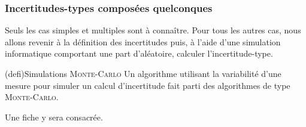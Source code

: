 \documentclass[../../main/main.tex]{subfiles}
\begin{document}
\subsubsection{Incertitudes-types composées quelconques}
Seuls les cas simples et multiples sont à connaître. Pour tous les autres cas,
nous allons revenir à la définition des incertitudes puis, à l'aide d'une
simulation informatique comportant une part d'aléatoire, calculer
l'incertitude-type.

\begin{tcb}(defi){Simulations \textsc{Monte-Carlo}}
	Un algorithme utilisant la variabilité d'une mesure pour simuler un calcul
	d'incertitude fait parti des algorithmes de type \textsc{Monte-Carlo}.
\end{tcb}

Une fiche y sera consacrée.
\end{document}
